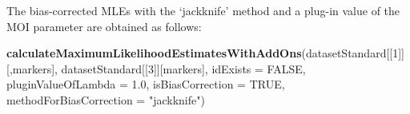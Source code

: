 \documentclass[
]{article}
\newenvironment{Shaded}{\begin{snugshade}}{\end{snugshade}}
\newcommand{\AttributeTok}[1]{\textcolor[rgb]{0.13,0.29,0.53}{#1}}
\newcommand{\ConstantTok}[1]{\textcolor[rgb]{0.56,0.35,0.01}{#1}}
\newcommand{\DecValTok}[1]{\textcolor[rgb]{0.00,0.00,0.81}{#1}}
\newcommand{\FloatTok}[1]{\textcolor[rgb]{0.00,0.00,0.81}{#1}}
\newcommand{\FunctionTok}[1]{\textcolor[rgb]{0.13,0.29,0.53}{\textbf{#1}}}
\newcommand{\NormalTok}[1]{#1}
\newcommand{\StringTok}[1]{\textcolor[rgb]{0.31,0.60,0.02}{#1}}
\begin{document}
The bias-corrected MLEs with the `jackknife' method and a plug-in value
of the MOI parameter are obtained as follows:

\begin{Shaded}
\begin{Highlighting}[]
\FunctionTok{calculateMaximumLikelihoodEstimatesWithAddOns}\NormalTok{(datasetStandard[[}\DecValTok{1}\NormalTok{]][,markers], datasetStandard[[}\DecValTok{3}\NormalTok{]][markers], }\AttributeTok{idExists =} \ConstantTok{FALSE}\NormalTok{, }\AttributeTok{pluginValueOfLambda =} \FloatTok{1.0}\NormalTok{, }\AttributeTok{isBiasCorrection =} \ConstantTok{TRUE}\NormalTok{, }\AttributeTok{methodForBiasCorrection =} \StringTok{"jackknife"}\NormalTok{)}
\end{Highlighting}
\end{Shaded}
\end{document}
